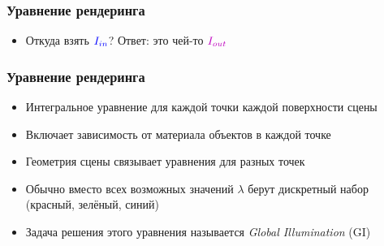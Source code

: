 \documentclass{beamer}
\begin{document}
\begin{frame}[fragile]
\frametitle{Уравнение рендеринга}
\begin{itemize}
\item Откуда взять \begin{math}{\color{blue}I_{in}}\end{math}? \pause Ответ: это чей-то \begin{math}{\color{magenta}I_{out}}\end{math} 
\end{itemize}
\begin{center}
\end{center}
\end{frame}

\begin{frame}[fragile]
\frametitle{Уравнение рендеринга}
\begin{itemize}
\item Интегральное уравнение для каждой точки каждой поверхности сцены
\pause
\item Включает зависимость от материала объектов в каждой точке
\pause
\item Геометрия сцены связывает уравнения для разных точек
\pause
\item Обычно вместо всех возможных значений \begin{math}\lambda\end{math} берут дискретный набор ({\color{red}красный}, {\color{green}зелёный}, {\color{blue}синий})
\pause
\item Задача решения этого уравнения называется \textit{Global Illumination} (GI)
\end{itemize}
\end{frame}
\end{document}
